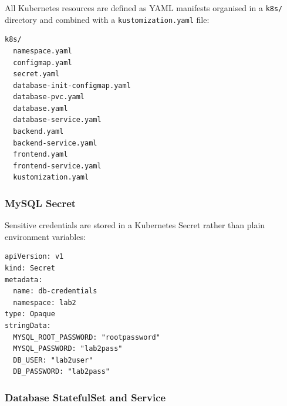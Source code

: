 \documentclass[12pt,a4paper]{article}
\begin{document}
All Kubernetes resources are defined as YAML manifests organised in a
\texttt{k8s/} directory and combined with a \texttt{kustomization.yaml} file:

\begin{verbatim}
k8s/
  namespace.yaml
  configmap.yaml
  secret.yaml
  database-init-configmap.yaml
  database-pvc.yaml
  database.yaml
  database-service.yaml
  backend.yaml
  backend-service.yaml
  frontend.yaml
  frontend-service.yaml
  kustomization.yaml
\end{verbatim}

\subsubsection{MySQL Secret}

Sensitive credentials are stored in a Kubernetes Secret rather than plain
environment variables:

\begin{lstlisting}[style=yamlstyle, caption={k8s/secret.yaml}]
apiVersion: v1
kind: Secret
metadata:
  name: db-credentials
  namespace: lab2
type: Opaque
stringData:
  MYSQL_ROOT_PASSWORD: "rootpassword"
  MYSQL_PASSWORD: "lab2pass"
  DB_USER: "lab2user"
  DB_PASSWORD: "lab2pass"
\end{lstlisting}

\subsubsection{Database StatefulSet and Service}
\end{document}
